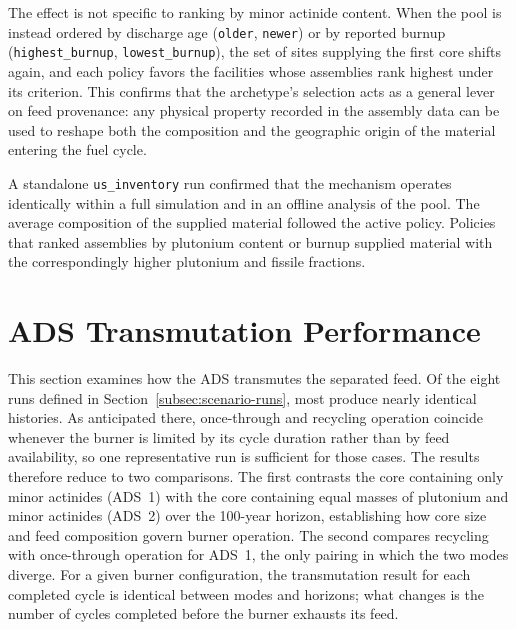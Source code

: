 The effect is not specific to ranking by minor actinide content. When the pool is
instead ordered by discharge age (\texttt{older}, \texttt{newer}) or by
reported burnup
(\texttt{highest\_burnup}, \texttt{lowest\_burnup}), the set of sites supplying
the first core shifts again, and each policy favors the facilities whose
assemblies rank highest under its criterion. This confirms that the archetype's
selection acts as a general lever on feed provenance: any physical property
recorded in the assembly data can be used to reshape both the composition and
the geographic origin of the material entering the fuel cycle.

A standalone \texttt{us\_inventory} run confirmed that the mechanism operates
identically within a full \Cyclus simulation and in an offline analysis of the
pool. The average composition of the supplied material followed the active
policy. Policies that ranked assemblies by plutonium content or burnup supplied
material with the correspondingly higher plutonium and fissile fractions.



\section{ADS Transmutation Performance}
\label{sec:results-ads}

This section examines how the \gls{ADS} transmutes the separated feed. Of the
eight runs defined in Section~\ref{subsec:scenario-runs}, most produce nearly
identical histories. As anticipated there, once-through and recycling operation
coincide whenever the burner is limited by its cycle duration rather than by feed
availability, so one representative run is sufficient for those cases. The
results therefore reduce to two comparisons. The first contrasts the core
containing only minor actinides (ADS~1) with the core containing equal masses of
plutonium and minor actinides (ADS~2) over the 100-year horizon, establishing how
core size and feed composition govern burner operation. The second compares
recycling with once-through operation for ADS~1, the only pairing in which the two
modes diverge. For a given burner configuration, the transmutation result for
each completed cycle is identical between modes and horizons; what changes is the
number of cycles completed before the burner exhausts its feed.

